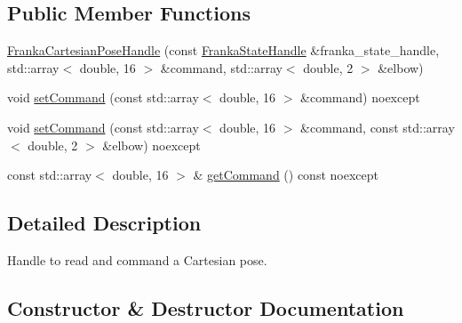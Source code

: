 \subsection*{Public Member Functions}
\begin{DoxyCompactItemize}
\item 
\hyperlink{classfranka__hw_1_1_franka_cartesian_pose_handle_a98190bd982c26fdf1d90fbec701ffb06}{Franka\+Cartesian\+Pose\+Handle} (const \hyperlink{classfranka__hw_1_1_franka_state_handle}{Franka\+State\+Handle} \&franka\+\_\+state\+\_\+handle, std\+::array$<$ double, 16 $>$ \&command, std\+::array$<$ double, 2 $>$ \&elbow)
\item 
void \hyperlink{classfranka__hw_1_1_franka_cartesian_pose_handle_a37b091755da28b088892e79c984e0634}{set\+Command} (const std\+::array$<$ double, 16 $>$ \&command) noexcept
\item 
void \hyperlink{classfranka__hw_1_1_franka_cartesian_pose_handle_a0a10bbd38414170da45412dc803cb428}{set\+Command} (const std\+::array$<$ double, 16 $>$ \&command, const std\+::array$<$ double, 2 $>$ \&elbow) noexcept
\item 
const std\+::array$<$ double, 16 $>$ \& \hyperlink{classfranka__hw_1_1_franka_cartesian_pose_handle_a844b5a45c8a54f6930c23d0161fdc30d}{get\+Command} () const noexcept
\end{DoxyCompactItemize}


\subsection{Detailed Description}
Handle to read and command a Cartesian pose. 

\subsection{Constructor \& Destructor Documentation}
\mbox{\label{classfranka__hw_1_1_franka_cartesian_pose_handle_a98190bd982c26fdf1d90fbec701ffb06}} 
